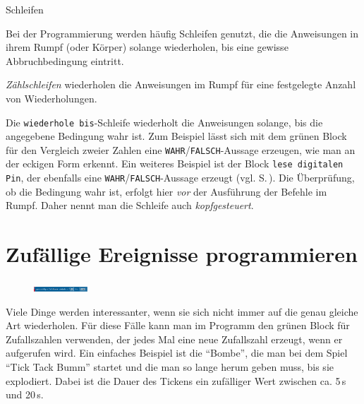 \begin{zsfg}{Schleifen}
	
	Bei der Programmierung werden häufig Schleifen genutzt, die die Anweisungen in ihrem Rumpf (oder Körper) solange wiederholen, bis eine gewisse Abbruchbedingung eintritt.
	
	\emph{Zählschleifen} wiederholen die Anweisungen im Rumpf für eine festgelegte Anzahl von Wiederholungen.
	
	Die \texttt{wiederhole bis}-Schleife wiederholt die Anweisungen solange, bis die angegebene Bedingung wahr ist. Zum Beispiel lässt sich mit dem grünen Block für den Vergleich zweier Zahlen eine \texttt{WAHR}/\texttt{FALSCH}-Aussage erzeugen, wie man an der eckigen Form erkennt. Ein weiteres Beispiel ist der Block \texttt{lese digitalen Pin}, der ebenfalls eine \texttt{WAHR}/\texttt{FALSCH}-Aussage erzeugt (vgl. S.\,\pageref{sec:digitalread}). Die Überprüfung, ob die Bedingung wahr ist, erfolgt hier \emph{vor} der Ausführung der Befehle im Rumpf. Daher nennt man die Schleife auch \emph{kopfgesteuert}.
\end{zsfg}

\newpage
\section{Zufällige Ereignisse programmieren}

\begin{figure}
	\centering
	\includegraphics[width=0.18\textwidth]{pics/zufallszahl.png}
\end{figure}
Viele Dinge werden interessanter, wenn sie sich nicht immer auf die genau gleiche Art wiederholen. Für diese Fälle kann man im Programm den grünen Block für Zufallszahlen verwenden, der jedes Mal eine neue Zufallszahl erzeugt, wenn er aufgerufen wird. Ein einfaches Beispiel ist die \enquote{Bombe}, die man bei dem Spiel \enquote{Tick Tack Bumm} startet und die man so lange herum geben muss, bis sie explodiert. Dabei ist die Dauer des Tickens ein zufälliger Wert zwischen ca. 5\,s und 20\,s.

